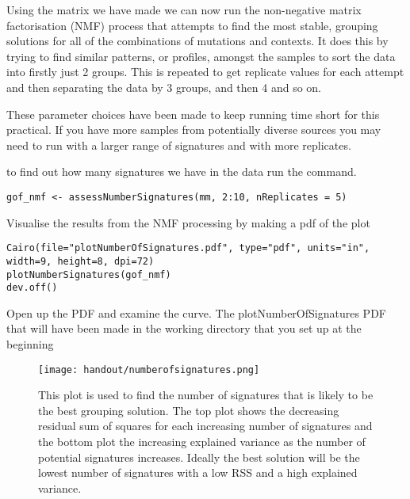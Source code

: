 Using the matrix we have made we can now run the non-negative matrix factorisation (NMF)
process that attempts to find the most stable, grouping solutions for all of the combinations
of mutations and contexts. It does this by trying to find similar patterns, or profiles,
amongst the samples to sort the data into firstly just 2 groups. This is repeated to get
replicate values for each attempt and then separating the data by 3 groups, and then 4 and so on.  
\vspace{4 mm}
\begin{note}
These parameter choices have been made to keep running time short for this practical.
If you have more samples from potentially diverse sources you may
need to run with a larger range of signatures and with more replicates.
\end{note}

\begin{steps}
to find out how many signatures we have in the data run the command.
\begin{lstlisting}
gof_nmf <- assessNumberSignatures(mm, 2:10, nReplicates = 5)
\end{lstlisting}

Visualise the results from the NMF processing by making a pdf of the plot
\begin{lstlisting}
Cairo(file="plotNumberOfSignatures.pdf", type="pdf", units="in", width=9, height=8, dpi=72)
plotNumberSignatures(gof_nmf)
dev.off()
\end{lstlisting}

Open up the PDF and examine the curve.
The plotNumberOfSignatures PDF that will have been made in the working directory that you set up at the beginning
\end{steps}

\begin{figure}[H]
\centering
\texttt{[image: handout/numberofsignatures.png]}
\caption{This plot is used to find the number of signatures that is likely
to be the best grouping solution. The top plot shows the decreasing residual
sum of squares for each increasing number of signatures and the bottom plot the
increasing explained variance as the number of potential signatures increases.
Ideally the best solution will be the lowest number of signatures with
a low RSS and a high explained variance.}
\label{Figure 1:Number of signatures plot}
\end{figure}

